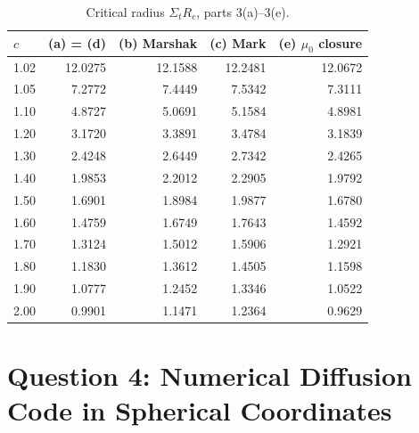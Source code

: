 \documentclass[11pt]{article}
\begin{document}
\begin{table}[hbt!]
    \centering
    \begin{tabular}{lrrrr}
        \toprule
        $c$ & (a) = (d) & (b) Marshak & (c) Mark & (e) $\mu_0$ closure \\
        \midrule
        1.02 & 12.0275 & 12.1588 & 12.2481 & 12.0672 \\
        1.05 & 7.2772 & 7.4449 & 7.5342 & 7.3111 \\
        1.10 & 4.8727 & 5.0691 & 5.1584 & 4.8981 \\
        1.20 & 3.1720 & 3.3891 & 3.4784 & 3.1839 \\
        1.30 & 2.4248 & 2.6449 & 2.7342 & 2.4265 \\
        1.40 & 1.9853 & 2.2012 & 2.2905 & 1.9792 \\
        1.50 & 1.6901 & 1.8984 & 1.9877 & 1.6780 \\
        1.60 & 1.4759 & 1.6749 & 1.7643 & 1.4592 \\
        1.70 & 1.3124 & 1.5012 & 1.5906 & 1.2921 \\
        1.80 & 1.1830 & 1.3612 & 1.4505 & 1.1598 \\
        1.90 & 1.0777 & 1.2452 & 1.3346 & 1.0522 \\
        2.00 & 0.9901 & 1.1471 & 1.2364 & 0.9629 \\
        \bottomrule
    \end{tabular}
    \caption{Critical radius $\Sigma_t R_c$, parts 3(a)--3(e).}
    \label{tab:q3all_sphere}
\end{table}




\newpage
\FloatBarrier
\section*{Question 4: Numerical Diffusion Code in Spherical Coordinates}
\end{document}
